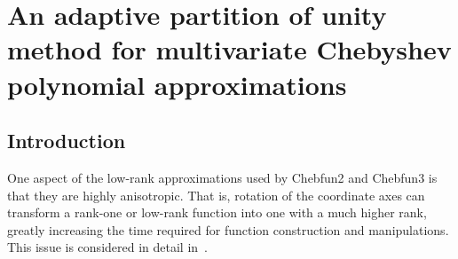 \chapter{An adaptive partition of unity method for multivariate Chebyshev polynomial approximations}
\label{pu_nd}

\section{Introduction}
\label{sec:introduction}



One aspect of the low-rank approximations used by Chebfun2 and Chebfun3 is that they are highly anisotropic. That is, rotation of the coordinate axes can transform a rank-one or low-rank function into one with a much higher rank, greatly increasing the time required for function construction and manipulations. This issue is considered in detail in~\cite{trefethen2017cubature}. 

